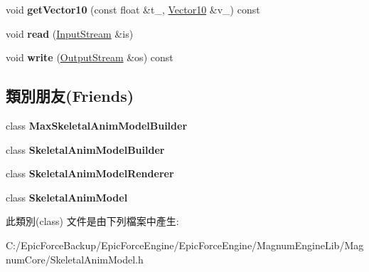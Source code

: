 \begin{DoxyCompactItemize}
\item 
void {\bfseries get\+Vector10} (const float \&t\+\_\+, \hyperlink{class_magnum_1_1_vector10}{Vector10} \&v\+\_\+) const \hypertarget{class_magnum_1_1endif_1_1_bone_animation_aaf375fee86324b53a94fd413b8cfa6f4}{}\label{class_magnum_1_1endif_1_1_bone_animation_aaf375fee86324b53a94fd413b8cfa6f4}

\item 
void {\bfseries read} (\hyperlink{class_magnum_1_1_input_stream}{Input\+Stream} \&is)\hypertarget{class_magnum_1_1endif_1_1_bone_animation_ae89203fcdc94b1f20adc38216ad36df2}{}\label{class_magnum_1_1endif_1_1_bone_animation_ae89203fcdc94b1f20adc38216ad36df2}

\item 
void {\bfseries write} (\hyperlink{class_magnum_1_1_output_stream}{Output\+Stream} \&os) const \hypertarget{class_magnum_1_1endif_1_1_bone_animation_af12cf3e67095bf578ee6bc98e2e6a8cb}{}\label{class_magnum_1_1endif_1_1_bone_animation_af12cf3e67095bf578ee6bc98e2e6a8cb}

\end{DoxyCompactItemize}
\subsection*{類別朋友(Friends)}
\begin{DoxyCompactItemize}
\item 
class {\bfseries Max\+Skeletal\+Anim\+Model\+Builder}\hypertarget{class_magnum_1_1endif_1_1_bone_animation_a68b08defd5651552ef2b6f922eee7ff9}{}\label{class_magnum_1_1endif_1_1_bone_animation_a68b08defd5651552ef2b6f922eee7ff9}

\item 
class {\bfseries Skeletal\+Anim\+Model\+Builder}\hypertarget{class_magnum_1_1endif_1_1_bone_animation_a31d58261bc4fbf7a6c1d2d2547437974}{}\label{class_magnum_1_1endif_1_1_bone_animation_a31d58261bc4fbf7a6c1d2d2547437974}

\item 
class {\bfseries Skeletal\+Anim\+Model\+Renderer}\hypertarget{class_magnum_1_1endif_1_1_bone_animation_ae50fe2cd824b9de98af4dd4aa51d4935}{}\label{class_magnum_1_1endif_1_1_bone_animation_ae50fe2cd824b9de98af4dd4aa51d4935}

\item 
class {\bfseries Skeletal\+Anim\+Model}\hypertarget{class_magnum_1_1endif_1_1_bone_animation_a88c72f2f6b125ba518843b71080035e5}{}\label{class_magnum_1_1endif_1_1_bone_animation_a88c72f2f6b125ba518843b71080035e5}

\end{DoxyCompactItemize}


此類別(class) 文件是由下列檔案中產生\+:\begin{DoxyCompactItemize}
\item 
C\+:/\+Epic\+Force\+Backup/\+Epic\+Force\+Engine/\+Epic\+Force\+Engine/\+Magnum\+Engine\+Lib/\+Magnum\+Core/Skeletal\+Anim\+Model.\+h\end{DoxyCompactItemize}

